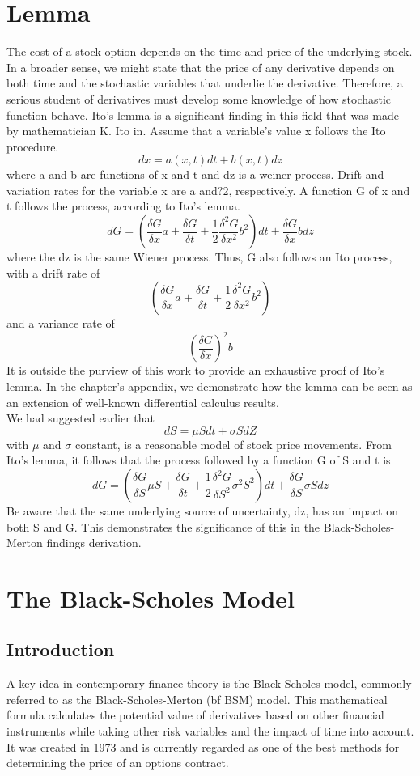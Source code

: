 \section{\ito Lemma}
The cost of a stock option depends on the time and price of the underlying stock. In a broader sense, we might state that the price of any derivative depends on both time and the stochastic variables that underlie the derivative. Therefore, a serious student of derivatives must develop some knowledge of how stochastic function behave. Ito's lemma is a significant finding in this field that was made by mathematician K. Ito in. Assume that a variable's value x follows the Ito procedure.
\[dx=a(x,t)dt+b(x,t)dz\]
where a and b are functions of x and t and dz is a weiner process. Drift and variation rates for the variable x are a and?2, respectively. A function G of x and t follows the process, according to Ito's lemma.
\[dG=(\frac{\delta G}{\delta x}a+\frac{\delta G}{\delta t}+\frac{1}{2}\frac{\delta^2 G}{\delta x^2}b^2)dt+\frac{\delta G}{\delta x}bdz\]
where the dz is the same Wiener process. Thus, G also follows an
Ito process, with a drift rate of
\[(\frac{\delta G}{\delta x}a+\frac{\delta G}{\delta t}+\frac{1}{2}\frac{\delta^2 G}{\delta x^2}b^2)\]
and a variance rate of
\[(\frac{\delta G}{\delta x})^2b\]
It is outside the purview of this work to provide an exhaustive proof of Ito's lemma. In the chapter's appendix, we demonstrate how the lemma can be seen as an extension of well-known differential calculus results. \\
We had suggested earlier that
\[dS=\mu S dt+\sigma S dZ\]
with $\mu$ and $\sigma$ constant, is a reasonable model of stock price movements. From Ito's
lemma, it follows that the process followed by a function G of S and t is
\[dG=(\frac{\delta G}{\delta S}\mu S+\frac{\delta G}{\delta t}+\frac{1}{2}\frac{\delta^2 G}{\delta S^2}\sigma^2 S^2)dt+\frac{\delta G}{\delta S}\sigma S dz\]
Be aware that the same underlying source of uncertainty, dz, has an impact on both S and G.
This demonstrates the significance of this in the Black-Scholes-Merton findings derivation.
\section{The Black-Scholes Model}
\subsection{ Introduction}
\noindent A key idea in contemporary finance theory is the Black-Scholes model, commonly referred to as the Black-Scholes-Merton (bf BSM) model. This mathematical formula calculates the potential value of derivatives based on other financial instruments while taking other risk variables and the impact of time into account. It was created in 1973 and is currently regarded as one of the best methods for determining the price of an options contract.
